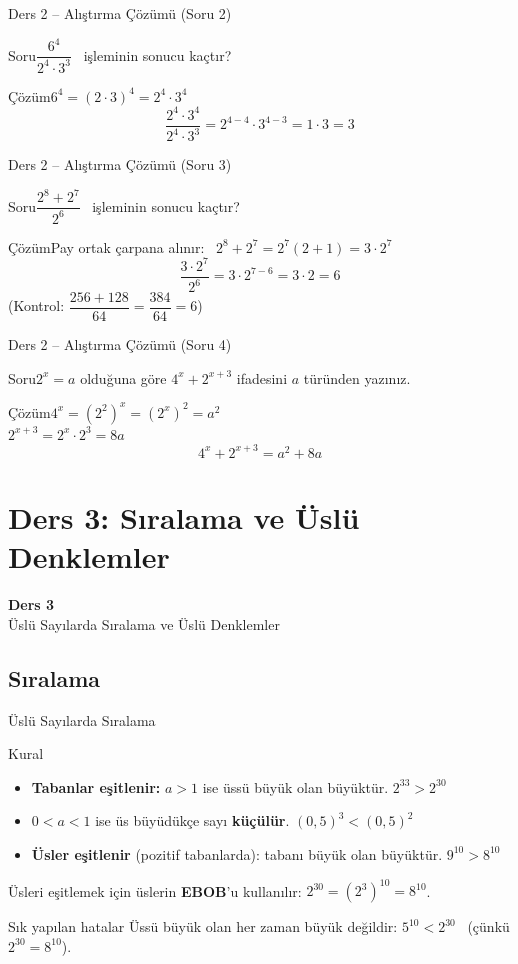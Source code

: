 \documentclass[aspectratio=169,11pt,handout]{beamer}
\newcommand{\soru}[3]{%
\begin{frame}{#1}
  \begin{block}{Soru}\large #2\end{block}
  \pause
  \begin{exampleblock}{Çözüm}\large #3\end{exampleblock}
\end{frame}}
\begin{document}
\soru{Ders 2 -- Alıştırma Çözümü (Soru 2)}
{\(\dfrac{6^4}{2^4\cdot 3^3}\) \ işleminin sonucu kaçtır?}
{\(6^4=(2\cdot 3)^4=2^4\cdot 3^4\)
\[\frac{2^4\cdot 3^4}{2^4\cdot 3^3}=2^{4-4}\cdot 3^{4-3}=1\cdot 3=3\]}

\soru{Ders 2 -- Alıştırma Çözümü (Soru 3)}
{\(\dfrac{2^8+2^7}{2^6}\) \ işleminin sonucu kaçtır?}
{Pay ortak çarpana alınır: \ \(2^8+2^7=2^7(2+1)=3\cdot 2^7\)
\[\frac{3\cdot 2^7}{2^6}=3\cdot 2^{7-6}=3\cdot 2=6\]
(Kontrol: \(\dfrac{256+128}{64}=\dfrac{384}{64}=6\))}

\soru{Ders 2 -- Alıştırma Çözümü (Soru 4)}
{\(2^x=a\) olduğuna göre \(4^x+2^{x+3}\) ifadesini \(a\) türünden yazınız.}
{\(4^x=(2^2)^x=(2^x)^2=a^2\)\\[4pt]
\(2^{x+3}=2^x\cdot 2^3=8a\)
\[4^x+2^{x+3}=a^2+8a\]}


\section{Ders 3: Sıralama ve Üslü Denklemler}
\begin{frame}
\centering\Large\color{anamavi}\textbf{Ders 3}\\[6pt]\normalsize Üslü Sayılarda Sıralama ve Üslü Denklemler
\end{frame}

\subsection{Sıralama}
\begin{frame}{Üslü Sayılarda Sıralama}
\begin{block}{Kural}
\begin{itemize}
\item \textbf{Tabanlar eşitlenir:} \(a>1\) ise üssü büyük olan büyüktür. \quad \(2^{33}>2^{30}\)
\item \(0<a<1\) ise üs büyüdükçe sayı \textbf{küçülür}. \quad \((0{,}5)^3<(0{,}5)^2\)
\item \textbf{Üsler eşitlenir} (pozitif tabanlarda): tabanı büyük olan büyüktür. \quad \(9^{10}>8^{10}\)
\end{itemize}
Üsleri eşitlemek için üslerin \textbf{EBOB}'u kullanılır: \(2^{30}=(2^3)^{10}=8^{10}\).
\end{block}
\begin{alertblock}{Sık yapılan hatalar}
Üssü büyük olan her zaman büyük değildir: \(5^{10}<2^{30}\) \ (çünkü \(2^{30}=8^{10}\)).
\end{alertblock}
\end{frame}
\end{document}
